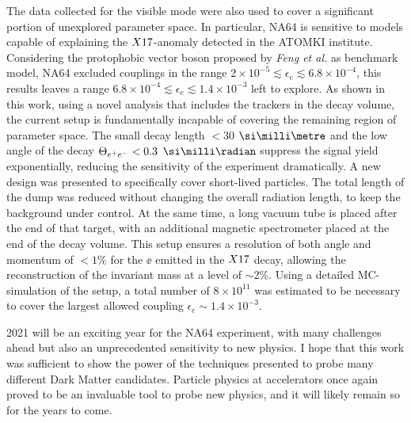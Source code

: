 The data collected for the visible mode were also used to cover a significant portion of unexplored parameter space. In particular, NA64 is sensitive to models capable of explaining the $X17$-anomaly detected in the ATOMKI institute. Considering the protophobic vector boson proposed by \textit{Feng et al.}\cite{Feng:2016jff} as benchmark model, NA64 excluded couplings in the range $2 \times 10^{-5} \lesssim \epsilon_e \lesssim 6.8 \times 10^{-4}$, this results leaves a range $6.8 \times 10^{-4} \lesssim \epsilon_e \lesssim 1.4 \times 10^{-3}$ left to explore. As shown in this work, using a novel analysis that includes the trackers in the decay volume, the current setup is fundamentally incapable of covering the remaining region of parameter space. The small decay length $<$30 $\mmi$ and the low angle of the decay $\Theta_{ e^+e^-} < 0.3$ $\mrad$ suppress the signal yield exponentially, reducing the sensitivity of the experiment dramatically. A new design was presented to specifically cover short-lived particles. The total length of the dump was reduced without changing the overall radiation length, to keep the background under control. At the same time, a long vacuum tube is placed after the end of that target, with an additional magnetic spectrometer placed at the end of the decay volume. This setup ensures a resolution of both angle and momentum of $<1\%$ for the $\ee$ emitted in the $X17$ decay, allowing the reconstruction of the invariant mass at a level of $\sim$2\%. Using a detailed MC-simulation of the setup, a total number of $8 \times 10^{11}$ was estimated to be necessary to cover the largest allowed coupling $\epsilon_e \sim 1.4 \times 10^{-3}$.

2021 will be an exciting year for the NA64 experiment, with many challenges ahead but also an unprecedented sensitivity to new physics. I hope that this work was sufficient to show the power of the techniques presented to probe many different Dark Matter candidates. Particle physics at accelerators once again proved to be an invaluable tool to probe new physics, and it will likely remain so for the years to come.


